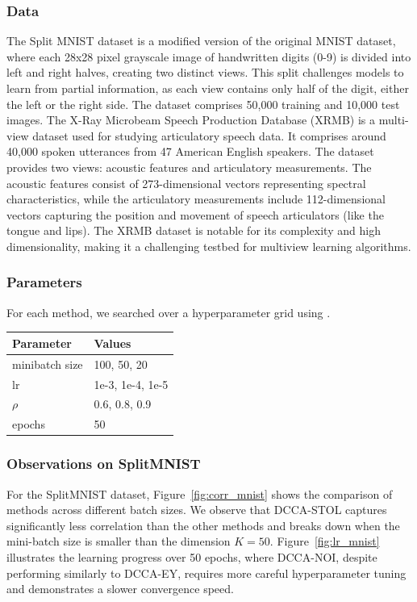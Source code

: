 \subsubsection{Data}
The Split MNIST dataset is a modified version of the original MNIST dataset, where each 28x28 pixel grayscale image of handwritten digits (0-9) is divided into left and right halves, creating two distinct views.
This split challenges models to learn from partial information, as each view contains only half of the digit, either the left or the right side.
The dataset comprises 50,000 training and 10,000 test images.
The X-Ray Microbeam Speech Production Database (XRMB) is a multi-view dataset used for studying articulatory speech data.
It comprises around 40,000 spoken utterances from 47 American English speakers.
The dataset provides two views: acoustic features and articulatory measurements.
The acoustic features consist of 273-dimensional vectors representing spectral characteristics, while the articulatory measurements include 112-dimensional vectors capturing the position and movement of speech articulators (like the tongue and lips).
The XRMB dataset is notable for its complexity and high dimensionality, making it a challenging testbed for multiview learning algorithms.

\subsubsection{Parameters} For each method, we searched over a hyperparameter grid using \citet{wandb}.

\begin{table}[h!]
    \centering
    \begin{tabular}{|l|l|}
        \hline Parameter           & Values           \\
        \hline minibatch size      & 100, 50, 20      \\
        \hline lr                  & 1e-3, 1e-4, 1e-5 \\
        \hline $\rho$\footnotemark & 0.6, 0.8, 0.9    \\
        \hline epochs              & 50               \\
        \hline
    \end{tabular}
    \label{tab:hyperparams}
\end{table}

\subsubsection{Observations on SplitMNIST}
For the SplitMNIST dataset, Figure~\ref{fig:corr_mnist} shows the comparison of methods across different batch sizes.
We observe that DCCA-STOL captures significantly less correlation than the other methods and breaks down when the mini-batch size is smaller than the dimension $K=50$.
Figure~\ref{fig:lr_mnist} illustrates the learning progress over 50 epochs, where DCCA-NOI, despite performing similarly to DCCA-EY, requires more careful hyperparameter tuning and demonstrates a slower convergence speed.

